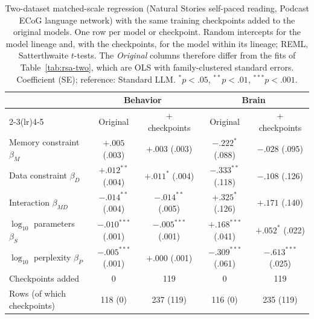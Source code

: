 \begin{table}[t]
\centering
\small
\setlength{\tabcolsep}{5pt}
\caption{Two-dataset matched-scale regression (Natural Stories self-paced reading, Podcast ECoG language network) with the same
training checkpoints added to the original models. One row per model or checkpoint. Random intercepts for the model lineage and, with the
checkpoints, for the model within its lineage; REML, Satterthwaite $t$-tests. The \emph{Original} columns therefore differ from the
fits of Table~\ref{tab:rsa-two}, which are OLS with family-clustered standard errors.
Coefficient (SE); reference: Standard LLM. $^{*}p<.05$, $^{**}p<.01$, $^{***}p<.001$.}
\label{tab:rsa-ckpt-two}
\begin{tabular}{lcccc}
\toprule
 & \multicolumn{2}{c}{Behavior} & \multicolumn{2}{c}{Brain} \\
\cmidrule(lr){2-3}\cmidrule(lr){4-5}
 & Original & + checkpoints & Original & + checkpoints \\
\midrule
Memory constraint $\beta_M$ & $+.005$ (.003) & $+.003$ (.003) & $-.222^{*}$ (.088) & $-.028$ (.095) \\
Data constraint $\beta_D$ & $+.012^{**}$ (.004) & $+.011^{*}$ (.004) & $-.333^{**}$ (.118) & $-.108$ (.126) \\
Interaction $\beta_{MD}$ & $-.014^{**}$ (.004) & $-.014^{**}$ (.005) & $+.325^{*}$ (.126) & $+.171$ (.140) \\
$\log_{10}$ parameters $\beta_S$ & $-.010^{***}$ (.001) & $-.005^{***}$ (.001) & $+.168^{***}$ (.041) & $+.052^{*}$ (.022) \\
$\log_{10}$ perplexity $\beta_P$ & $-.005^{***}$ (.001) & $+.000$ (.001) & $-.309^{***}$ (.061) & $-.613^{***}$ (.025) \\
\midrule
Checkpoints added & 0 & 119 & 0 & 119 \\
Rows (of which checkpoints) & 118 (0) & 237 (119) & 116 (0) & 235 (119) \\
\bottomrule
\end{tabular}
\end{table}
